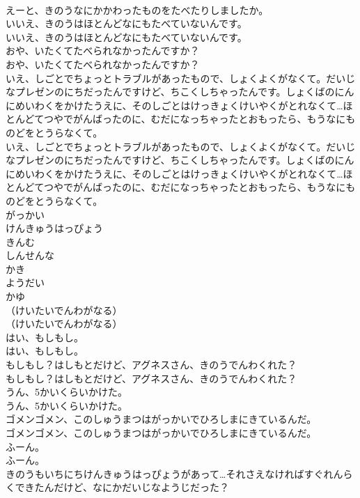 \documentclass[8pt]{extreport}
\begin{document}
\begin{CJK}{UTF8}{min}
\\	えーと、きのうなにかかわったものをたべたりしましたか。
\\	いいえ、きのうはほとんどなにもたべていないんです。
\\	いいえ、きのうはほとんどなにもたべていないんです。
\\	おや、いたくてたべられなかったんですか？
\\	おや、いたくてたべられなかったんですか？
\\	いえ、しごとでちょっとトラブルがあったもので、しょくよくがなくて。だいじなプレゼンのにちだったんですけど、ちこくしちゃったんです。しょくばのにんにめいわくをかけたうえに、そのしごとはけっきょくけいやくがとれなくて…ほとんどてつやでがんばったのに、むだになっちゃったとおもったら、もうなにものどをとうらなくて。
\\	いえ、しごとでちょっとトラブルがあったもので、しょくよくがなくて。だいじなプレゼンのにちだったんですけど、ちこくしちゃったんです。しょくばのにんにめいわくをかけたうえに、そのしごとはけっきょくけいやくがとれなくて…ほとんどてつやでがんばったのに、むだになっちゃったとおもったら、もうなにものどをとうらなくて。
\\	がっかい
\\	けんきゅうはっぴょう
\\	きんむ
\\	しんせんな
\\	かき
\\	ようだい
\\	かゆ
\\	（けいたいでんわがなる）
\\	（けいたいでんわがなる）
\\	はい、もしもし。
\\	はい、もしもし。
\\	もしもし？はしもとだけど、アグネスさん、きのうでんわくれた？
\\	もしもし？はしもとだけど、アグネスさん、きのうでんわくれた？
\\	うん、5かいくらいかけた。
\\	うん、5かいくらいかけた。
\\	ゴメンゴメン、このしゅうまつはがっかいでひろしまにきているんだ。
\\	ゴメンゴメン、このしゅうまつはがっかいでひろしまにきているんだ。
\\	ふーん。
\\	ふーん。
\\	きのうもいちにちけんきゅうはっぴょうがあって…それさえなければすぐれんらくできたんだけど、なにかだいじなようじだった？

\end{CJK}
\end{document}
